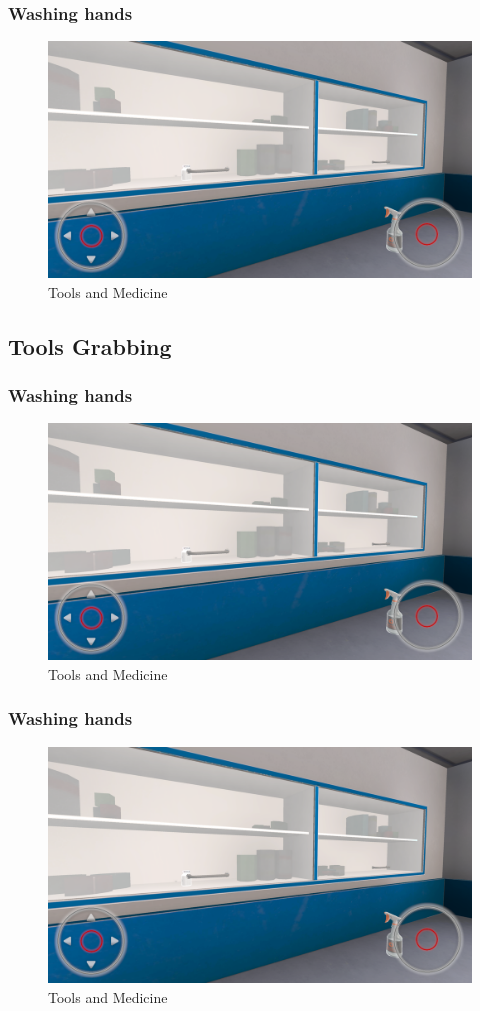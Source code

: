 \subsubsection{Washing hands}
\begin{figure}[h]
	\centering
	\includegraphics[width=0.65\linewidth]{Images/Tools and Medicine.png}
	\caption{Tools and Medicine}
	\label{fig:system-diagram}
\end{figure}



\subsection{Tools Grabbing}
\subsubsection{Washing hands}
\begin{figure}[h]
	\centering
	\includegraphics[width=0.65\linewidth]{Images/Tools and Medicine.png}
	\caption{Tools and Medicine}
	\label{fig:system-diagram}
\end{figure}

\subsubsection{Washing hands}
\begin{figure}[h]
	\centering
	\includegraphics[width=0.65\linewidth]{Images/Tools and Medicine.png}
	\caption{Tools and Medicine}
	\label{fig:system-diagram}
\end{figure}


